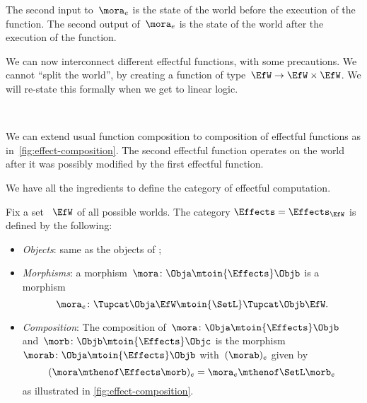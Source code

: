 The second input to~$\mora_e$ is the state of the world before the execution of the function.
The second output of~$\mora_e$ is the state of the world after the execution of the function.

We can now interconnect different effectful functions, with some precautions.
We cannot ``split the world'', by creating a function of type~$\EfW \to  \EfW \times \EfW$.
We will re-state this formally when we get to linear logic.

\begin{marginfigure}
    \centering
    \\
    \caption{}
    \label{fig:effect-composition}
\end{marginfigure}

We can extend usual function composition to composition of effectful functions as in~\cref{fig:effect-composition}.
The second effectful function operates on the world after it was possibly modified by the first effectful function.

We have all the ingredients to define the category \Effects of effectful computation.

\begin{definition}
    Fix a set ~$\EfW$ of all possible worlds.
    The category $\Effects=  \Effects_\EfW$ is defined by the following:
    \begin{itemize}
        \item \emph{Objects}: same as the objects of \SetL;
        \item \emph{Morphisms}: a morphism~$\mora\colon \Obja \mtoin{\Effects} \Objb$ is a morphism
              \begin{equation}
                  \mora_e\colon \Tupcat \Obja \EfW \mtoin{\SetL} \Tupcat \Objb \EfW.
              \end{equation}
        \item \emph{Composition}: The composition of~$\mora\colon \Obja \mtoin{\Effects} \Objb$ and~$\morb\colon \Objb \mtoin{\Effects} \Objc$ is the morphism~$\morab\colon \Obja \mtoin{\Effects} \Objb$ with~$(\morab)_e$ given by
              \begin{equation}
                  (\mora \mthenof \Effects \morb)
                  _e = \mora_e \mthenof\SetL \morb_e
              \end{equation}
              as illustrated in \cref{fig:effect-composition}.
    \end{itemize}
\end{definition}

